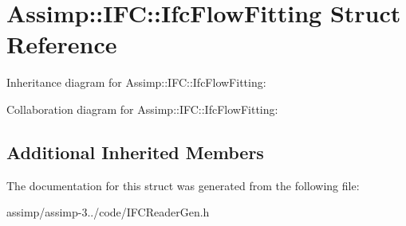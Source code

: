 \hypertarget{struct_assimp_1_1_i_f_c_1_1_ifc_flow_fitting}{\section{Assimp\+:\+:I\+F\+C\+:\+:Ifc\+Flow\+Fitting Struct Reference}
\label{struct_assimp_1_1_i_f_c_1_1_ifc_flow_fitting}
}


Inheritance diagram for Assimp\+:\+:I\+F\+C\+:\+:Ifc\+Flow\+Fitting\+:


Collaboration diagram for Assimp\+:\+:I\+F\+C\+:\+:Ifc\+Flow\+Fitting\+:
\subsection*{Additional Inherited Members}


The documentation for this struct was generated from the following file\+:\begin{DoxyCompactItemize}
\item 
assimp/assimp-\/3../code/I\+F\+C\+Reader\+Gen.\+h\end{DoxyCompactItemize}
